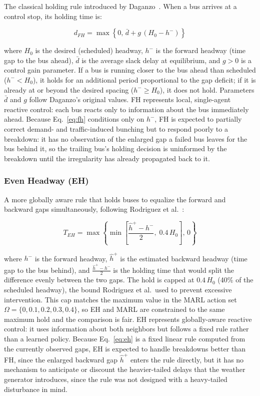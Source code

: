 The classical holding rule introduced by Daganzo~\cite{Daganzo2009}. When a bus arrives at a control stop, its holding time is:

\begin{equation}
d_{FH} = \max\!\left\{0,\, \bar{d} + g\,(H_0 - h^-)\right\}
\label{eq:fh}
\end{equation}

where $H_0$ is the desired (scheduled) headway, $h^-$ is the forward headway (time gap to the bus ahead), $\bar{d}$ is the average slack delay at equilibrium, and $g > 0$ is a control gain parameter. If a bus is running closer to the bus ahead than scheduled ($h^- < H_0$), it holds for an additional period proportional to the gap deficit; if it is already at or beyond the desired spacing ($h^- \geq H_0$), it does not hold. Parameters $\bar{d}$ and $g$ follow Daganzo's original values. FH represents local, single-agent reactive control: each bus reacts only to information about the bus immediately ahead. Because Eq.~\eqref{eq:fh} conditions only on $h^-$, FH is expected to partially correct demand- and traffic-induced bunching but to respond poorly to a breakdown: it has no observation of the enlarged gap a failed bus leaves for the bus behind it, so the trailing bus's holding decision is uninformed by the breakdown until the irregularity has already propagated back to it.

\subsubsection{Even Headway (EH)}

A more globally aware rule that holds buses to equalize the forward and backward gaps simultaneously, following Rodriguez et al.~\cite{Rodriguez2023Cooperative}:

\begin{equation}
T_{EH} = \max\!\left\{\min\!\left[\frac{\hat{h}^+ - h^-}{2},\; 0.4\,H_0\right],\, 0\right\}
\label{eq:eh}
\end{equation}

where $h^-$ is the forward headway, $\hat{h}^+$ is the estimated backward headway (time gap to the bus behind), and $\frac{\hat{h}^+ - h^-}{2}$ is the holding time that would split the difference evenly between the two gaps. The hold is capped at $0.4\,H_0$ (40\% of the scheduled headway), the bound Rodriguez et al.\ used to prevent excessive intervention. This cap matches the maximum value in the MARL action set $\Omega = \{0, 0.1, 0.2, 0.3, 0.4\}$, so EH and MARL are constrained to the same maximum hold and the comparison is fair. EH represents globally-aware reactive control: it uses information about both neighbors but follows a fixed rule rather than a learned policy. Because Eq.~\eqref{eq:eh} is a fixed linear rule computed from the currently observed gaps, EH is expected to handle breakdowns better than FH, since the enlarged backward gap $\hat{h}^+$ enters the rule directly, but it has no mechanism to anticipate or discount the heavier-tailed delays that the weather generator introduces, since the rule was not designed with a heavy-tailed disturbance in mind.

